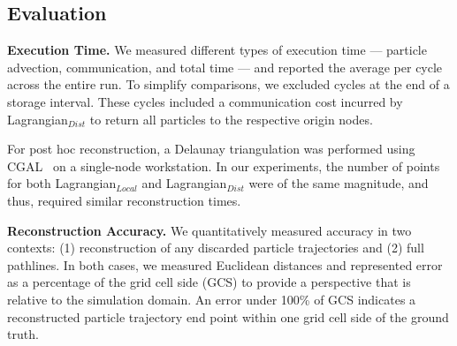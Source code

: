 \vspace{-2mm}
\subsection{Evaluation}
\label{sec:metrics}
%
\textbf{Execution Time.} We measured different types of execution time --- particle advection, communication, and total time --- and reported the average per cycle across the entire run.
%
To simplify comparisons, we excluded cycles at the end of a storage interval. 
%
These cycles included a communication cost incurred by Lagrangian$_{Dist}$ to return all particles to the respective origin nodes. 
%

For post hoc reconstruction, a Delaunay triangulation was performed using CGAL~\cite{2020cgal} on a single-node workstation.
%
In our experiments, the number of points for both Lagrangian$_{Local}$ and Lagrangian$_{Dist}$ were of the same magnitude, and thus, required similar reconstruction times.
%
%
%
%
%
%

\textbf{Reconstruction Accuracy.} We quantitatively measured accuracy in two contexts: (1) reconstruction of any discarded particle trajectories and (2) full pathlines.  
%
In both cases, we measured Euclidean distances and represented error as a percentage of the grid cell side (GCS) to provide a perspective that is relative to the simulation domain.
%
An error under 100\% of GCS indicates a reconstructed particle trajectory end point within one grid cell side of the ground truth.


